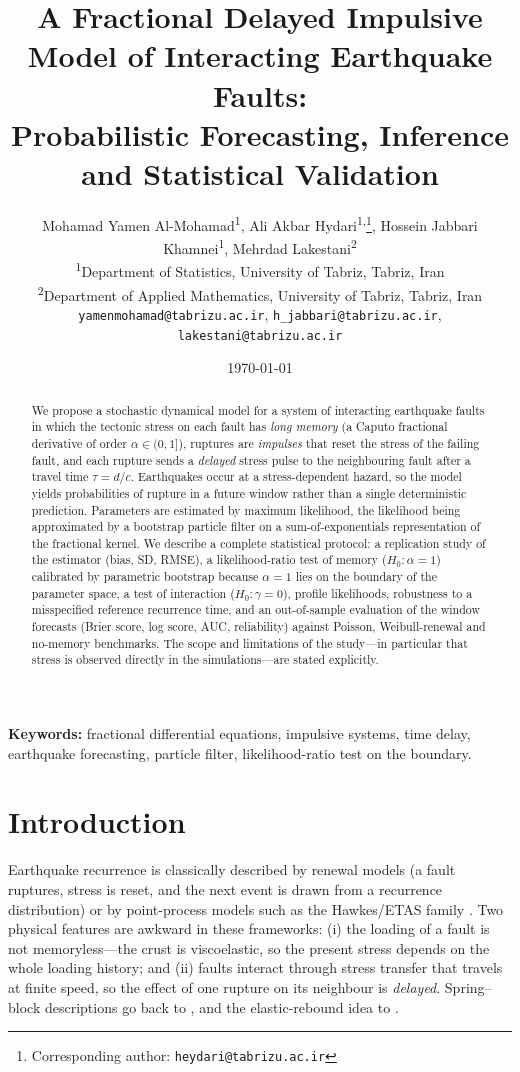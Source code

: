 \documentclass[11pt,a4paper]{article}
\title{\textbf{A Fractional Delayed Impulsive Model of Interacting Earthquake Faults:\\ Probabilistic Forecasting, Inference and Statistical Validation}}
\author{Mohamad Yamen Al-Mohamad\textsuperscript{1}, Ali Akbar Hydari\textsuperscript{1,}\thanks{Corresponding author: \texttt{heydari@tabrizu.ac.ir}}, Hossein Jabbari Khamnei\textsuperscript{1}, Mehrdad Lakestani\textsuperscript{2}\\[3pt]
\small\textsuperscript{1}Department of Statistics, University of Tabriz, Tabriz, Iran\\
\small\textsuperscript{2}Department of Applied Mathematics, University of Tabriz, Tabriz, Iran\\
\small \texttt{yamenmohamad@tabrizu.ac.ir}, \texttt{h\_jabbari@tabrizu.ac.ir}, \texttt{lakestani@tabrizu.ac.ir}}
\date{\today}
\begin{document}
\maketitle

\begin{abstract}
We propose a stochastic dynamical model for a system of interacting earthquake faults in which the tectonic stress on each fault has \emph{long memory} (a Caputo fractional derivative of order $\alpha\in(0,1]$), ruptures are \emph{impulses} that reset the stress of the failing fault, and each rupture sends a \emph{delayed} stress pulse to the neighbouring fault after a travel time $\tau=d/c$. Earthquakes occur at a stress-dependent hazard, so the model yields probabilities of rupture in a future window rather than a single deterministic prediction. Parameters are estimated by maximum likelihood, the likelihood being approximated by a bootstrap particle filter on a sum-of-exponentials representation of the fractional kernel. We describe a complete statistical protocol: a replication study of the estimator (bias, SD, RMSE), a likelihood-ratio test of memory ($H_0:\alpha=1$) calibrated by parametric bootstrap because $\alpha=1$ lies on the boundary of the parameter space, a test of interaction ($H_0:\gamma=0$), profile likelihoods, robustness to a misspecified reference recurrence time, and an out-of-sample evaluation of the window forecasts (Brier score, log score, AUC, reliability) against Poisson, Weibull-renewal and no-memory benchmarks. The scope and limitations of the study---in particular that stress is observed directly in the simulations---are stated explicitly.
\end{abstract}

\noindent\textbf{Keywords:} fractional differential equations, impulsive systems, time delay, earthquake forecasting, particle filter, likelihood-ratio test on the boundary.

\section{Introduction}
Earthquake recurrence is classically described by renewal models (a fault ruptures, stress is reset, and the next event is drawn from a recurrence distribution) or by point-process models such as the Hawkes/ETAS family \citep{Hawkes1971,Ogata1988}. Two physical features are awkward in these frameworks: (i) the loading of a fault is not memoryless---the crust is viscoelastic, so the present stress depends on the whole loading history; and (ii) faults interact through stress transfer that travels at finite speed, so the effect of one rupture on its neighbour is \emph{delayed}. Spring--block descriptions go back to \citet{BurridgeKnopoff1967}, and the elastic-rebound idea to \citet{Reid1910}.
\end{document}

